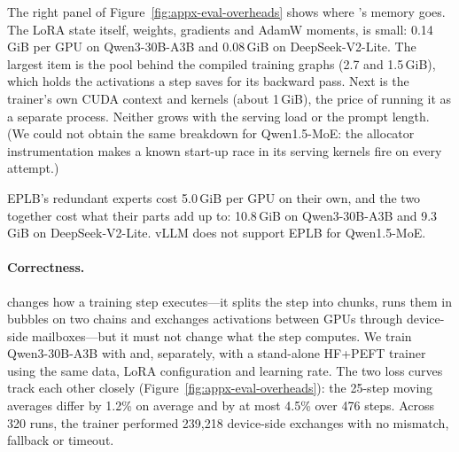 The right panel of Figure~\ref{fig:appx-eval-overheads} shows where \sys{}'s
memory goes. The LoRA state itself, weights, gradients and AdamW moments, is
small: 0.14\,GiB per GPU on Qwen3-30B-A3B and 0.08\,GiB on DeepSeek-V2-Lite.
The largest item is the pool behind the compiled training graphs (2.7 and
1.5\,GiB), which holds the activations a step saves for its backward pass.
Next is the trainer's own CUDA context and kernels (about 1\,GiB), the
price of running it as a separate process. Neither grows with the serving
load or the prompt length. (We could not obtain the same breakdown for
Qwen1.5-MoE: the allocator instrumentation makes a known start-up race in
its serving kernels fire on every attempt.)

EPLB's redundant experts cost 5.0\,GiB per GPU on their own, and the two
together cost what their parts add up to: 10.8\,GiB on Qwen3-30B-A3B and
9.3\,GiB on DeepSeek-V2-Lite. vLLM does not support EPLB for Qwen1.5-MoE.

\paragraph{Correctness.}
\sys{} changes how a training step executes---it splits the step into
chunks, runs them in bubbles on two chains and exchanges activations
between GPUs through device-side mailboxes---but it must not change what the
step computes. We train Qwen3-30B-A3B with \sys{} and, separately, with a
stand-alone HF+PEFT trainer using the same data, LoRA configuration
and learning rate. The two loss curves track each other closely
(Figure~\ref{fig:appx-eval-overheads}): the 25-step moving averages differ by
1.2\% on average and by at most 4.5\% over 476 steps. Across 320 \sys{} runs,
the trainer performed 239{,}218 device-side exchanges with no
mismatch, fallback or timeout.

